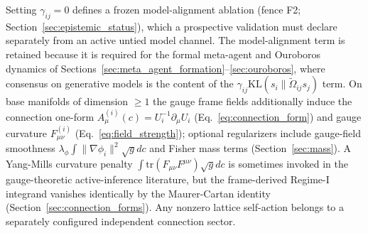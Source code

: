 \documentclass[11pt]{article}
\begin{document}
Setting $\gamma_{ij}=0$ defines a frozen model-alignment ablation (fence F2; Section~\ref{sec:epistemic_status}), which a prospective validation must declare separately from an active untied model channel. The model-alignment term is retained because it is required for the formal meta-agent and Ouroboros dynamics of Sections~\ref{sec:meta_agent_formation}--\ref{sec:ouroboros}, where consensus on generative models is the content of the $\gamma_{ij}\mathrm{KL}(s_i\|\tilde{\Omega}_{ij}s_j)$ term. On base manifolds of dimension $\geq 1$ the gauge frame fields additionally induce the connection one-form $A_\mu^{(i)}(c) = U_i^{-1}\partial_\mu U_i$ (Eq.~\ref{eq:connection_form}) and gauge curvature $F_{\mu\nu}^{(i)}$ (Eq.~\ref{eq:field_strength}); optional regularizers include gauge-field smoothness $\lambda_\phi \int \|\nabla \phi_i\|^2 \sqrt{g}  dc$ and Fisher mass terms (Section~\ref{sec:mass}). A Yang-Mills curvature penalty $\int \mathrm{tr}(F_{\mu\nu} F^{\mu\nu}) \sqrt{g}  dc$ is sometimes invoked in the gauge-theoretic active-inference literature, but the frame-derived Regime-I integrand vanishes identically by the Maurer-Cartan identity (Section~\ref{sec:connection_forms}). Any nonzero lattice self-action belongs to a separately configured independent connection sector.
\end{document}
